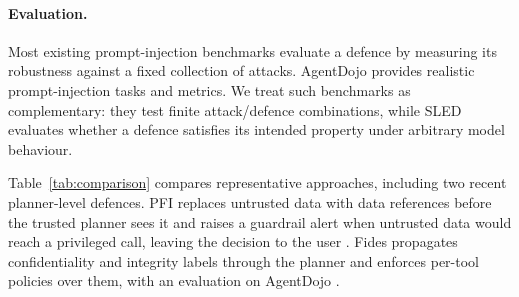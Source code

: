 \documentclass{article}
\begin{document}
\paragraph{Evaluation.}
Most existing prompt-injection benchmarks evaluate a defence by measuring its
robustness against a fixed collection of attacks. AgentDojo
\citep{agentdojo2024} provides realistic prompt-injection tasks and metrics.
We treat such benchmarks as complementary: they test finite attack/defence
combinations, while SLED evaluates whether a defence satisfies its intended
property under arbitrary model behaviour.

Table~\ref{tab:comparison} compares representative approaches, including two recent planner-level defences. PFI replaces untrusted data with data references before the trusted planner sees it and raises a guardrail alert when untrusted data would reach a privileged call, leaving the decision to the user \citep{pfi2025}. Fides propagates confidentiality and integrity labels through the planner and enforces per-tool policies over them, with an evaluation on AgentDojo \citep{fides2025}.
\end{document}
